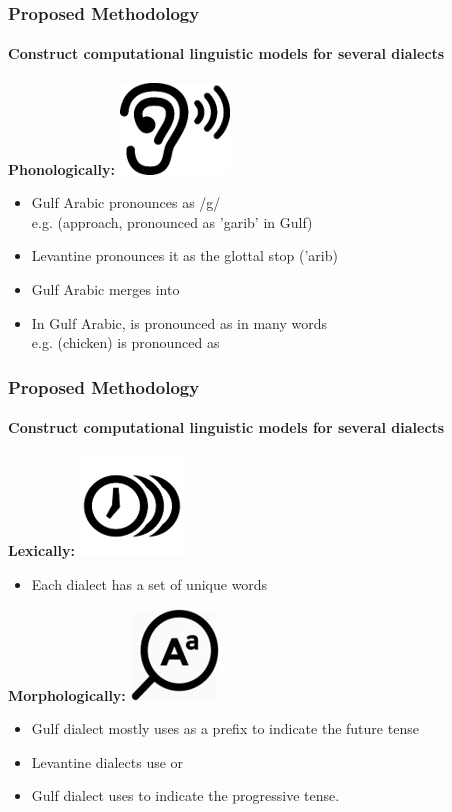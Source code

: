 \documentclass[xcolor=table]{beamer}
\begin{document}
\begin{frame}
\frametitle{Proposed Methodology}
\framesubtitle{Construct computational linguistic models for several dialects}


\textbf{Phonologically:     }\includegraphics[scale=0.3]{img0022.png}
\begin{itemize}[<+->]
    \item Gulf Arabic pronounces  as /g/~\\ e.g.  (approach, pronounced as 'garib' in Gulf)
    \item Levantine pronounces it as the glottal stop ('arib)
    \item Gulf Arabic merges  into 
    \item In Gulf Arabic,  is pronounced as  in many words \\e.g.  (chicken) is pronounced as 
\end{itemize}

\end{frame}

\begin{frame}[<+->]
\frametitle{Proposed Methodology}
\framesubtitle{Construct computational linguistic models for several dialects}
\textbf{Lexically:   }\includegraphics[scale=0.3]{img0023.png}
\begin{itemize}
    \item Each dialect has a set of unique words
\end{itemize}

\textbf{Morphologically:   }\includegraphics[scale=0.3]{img0024.png}
\begin{itemize}
    \item Gulf dialect mostly uses 
 as a prefix to indicate the future tense
 \item Levantine
 dialects use  or 
 \item Gulf dialect uses  to indicate the progressive tense.
\end{itemize}

\end{frame}
\end{document}
